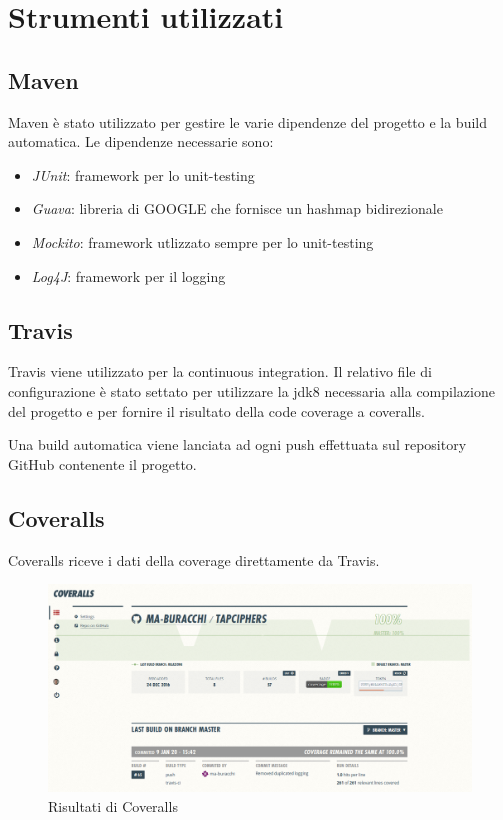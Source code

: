 \chapter{Strumenti utilizzati}

	\section{Maven}
		Maven è stato utilizzato per gestire le varie dipendenze del progetto e la build automatica.
		Le dipendenze necessarie sono: 
		\begin{itemize}
			\item \emph{JUnit}: framework per lo unit-testing
			\item \emph{Guava}: libreria di GOOGLE che fornisce un hashmap bidirezionale
			\item \emph{Mockito}: framework utlizzato sempre per lo unit-testing
			\item \emph{Log4J}: framework per il logging 
		\end{itemize}
		
	\section{Travis}
		Travis viene utilizzato per la continuous integration. Il relativo file di configurazione è stato settato per utilizzare la jdk8 necessaria alla compilazione del progetto e per fornire il risultato della code coverage a coveralls.
		
		Una build automatica viene lanciata ad ogni push effettuata sul repository GitHub contenente il progetto.
		
	\section{Coveralls}
		Coveralls riceve i dati della coverage direttamente da Travis.
		
		\begin{figure}[h]
			\centering
			\includegraphics[scale=0.2]{img/coverall}
			\caption{Risultati di Coveralls}
			\label{fig:coveralls}
		\end{figure}
				
